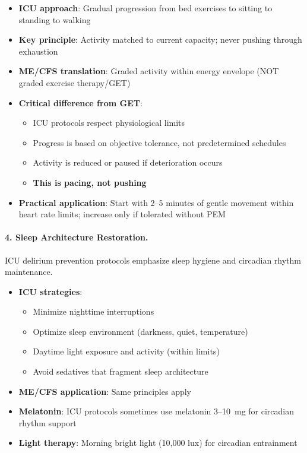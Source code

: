 \begin{itemize}
    \item \textbf{ICU approach}: Gradual progression from bed exercises to sitting to standing to walking
    \item \textbf{Key principle}: Activity matched to current capacity; never pushing through exhaustion
    \item \textbf{ME/CFS translation}: Graded activity within energy envelope (NOT graded exercise therapy/GET)
    \item \textbf{Critical difference from GET}:
    \begin{itemize}
        \item ICU protocols respect physiological limits
        \item Progress is based on objective tolerance, not predetermined schedules
        \item Activity is reduced or paused if deterioration occurs
        \item \textbf{This is pacing, not pushing}
    \end{itemize}
    \item \textbf{Practical application}: Start with 2--5 minutes of gentle movement within heart rate limits; increase only if tolerated without PEM
\end{itemize}

\paragraph{4. Sleep Architecture Restoration.}
ICU delirium prevention protocols emphasize sleep hygiene and circadian rhythm maintenance.

\begin{itemize}
    \item \textbf{ICU strategies}:
    \begin{itemize}
        \item Minimize nighttime interruptions
        \item Optimize sleep environment (darkness, quiet, temperature)
        \item Daytime light exposure and activity (within limits)
        \item Avoid sedatives that fragment sleep architecture
    \end{itemize}
    \item \textbf{ME/CFS application}: Same principles apply
    \item \textbf{Melatonin}: ICU protocols sometimes use melatonin 3--10~mg for circadian rhythm support
    \item \textbf{Light therapy}: Morning bright light (10,000 lux) for circadian entrainment
\end{itemize}

